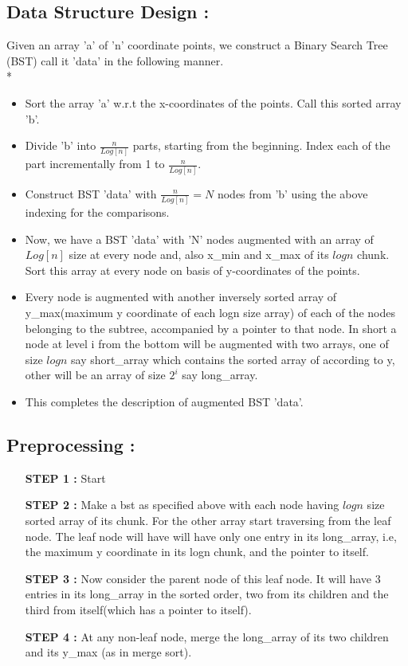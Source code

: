\documentclass{article}
\begin{document}
\subsection{Data Structure Design : } 
Given an array 'a' of 'n' coordinate points, we construct a Binary Search Tree (BST) call it 'data' in the following manner.\\*
\begin{itemize}
\item Sort the array 'a' w.r.t the x-coordinates of the points. Call this sorted array 'b'.
\item Divide 'b' into $ \frac{n}{Log[n]} $ parts, starting from the beginning. Index each of the part incrementally from 1 to $ \frac{n}{Log[n]} $. 
\item Construct BST 'data' with $ \frac{n}{Log[n]} = N $ nodes from 'b' using the above indexing for the comparisons.
\item Now, we have a BST 'data' with 'N' nodes augmented with an array of $Log[n]$ size at every node and, also
    x\_min and x\_max of its $logn$ chunk. Sort this array at every node on basis of y-coordinates of the points.
\item Every node is augmented with another inversely sorted array of y\_max(maximum y coordinate of each logn size array)
    of each of the nodes belonging to the subtree, accompanied by a pointer to that node. 
    In short a node at level i from the bottom will be augmented with two arrays, one of size $logn$ say short\_array
    which contains the sorted array of according to y, other will be an array of size $2^i$ say long\_array.
\item This completes the description of augmented BST 'data'.
\end{itemize}

\subsection{Preprocessing : }
\begin{itemize}
\item[\bf STEP 1 : ]
Start
\item[\bf STEP 2 : ]
Make a bst as specified above with each node having $logn$ size sorted array of its chunk. For the other array
start traversing from the leaf node. 
The leaf node will have will have only one entry in its long\_array, i.e, the maximum y coordinate in its logn chunk,
and the pointer to itself. 
\item[\bf STEP 3 : ]
Now consider the parent node of this leaf node. It will have 3 entries in its long\_array in the sorted order, 
two from its children and the third from itself(which has a pointer to itself). 
\item[\bf STEP 4 : ]
    At any non-leaf node, merge the long\_array of its two children and its y\_max (as in merge sort).

\end{itemize}
\end{document}
